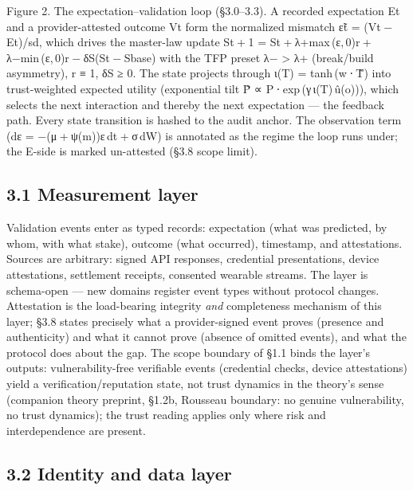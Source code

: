 \documentclass[
]{article}
\begin{document}
Figure 2. The expectation--validation loop (§3.0--3.3). A recorded
expectation {Et} and a provider-attested outcome {Vt} form the
normalized mismatch {ε̃t = (Vt − Et)/sd}, which drives the master-law
update {St + 1 = St + λ+max (ε, 0)r + λ−min (ε, 0)r − δS(St − Sbase)}
with the TFP preset {λ− \textgreater{} λ+} (break/build asymmetry),
{r ≡ 1}, {δS ≥ 0}. The state projects through {ι(T) = tanh (w ⋅ T̃)} into
trust-weighted expected utility (exponential tilt
{P̃ ∝ P ⋅ exp (γ ι(T) û(o))}), which selects the next interaction and
thereby the next expectation --- the feedback path. Every state
transition is hashed to the audit anchor. The observation term
({dε = −(μ + ψ(m))ε dt + σ dW}) is annotated as the regime the loop runs
under; the {E}-side is marked un-attested (§3.8 scope limit).

\subsection{3.1 Measurement layer}\label{measurement-layer}

Validation events enter as typed records: expectation (what was
predicted, by whom, with what stake), outcome (what occurred),
timestamp, and attestations. Sources are arbitrary: signed API
responses, credential presentations, device attestations, settlement
receipts, consented wearable streams. The layer is schema-open --- new
domains register event types without protocol changes. Attestation is
the load-bearing integrity \emph{and} completeness mechanism of this
layer; §3.8 states precisely what a provider-signed event proves
(presence and authenticity) and what it cannot prove (absence of omitted
events), and what the protocol does about the gap. The scope boundary of
§1.1 binds the layer's outputs: vulnerability-free verifiable events
(credential checks, device attestations) yield a verification/reputation
state, not trust dynamics in the theory's sense (companion theory
preprint, §1.2b, Rousseau boundary: no genuine vulnerability, no trust
dynamics); the trust reading applies only where risk and interdependence
are present.

\subsection{3.2 Identity and data layer}\label{identity-and-data-layer}
\end{document}

